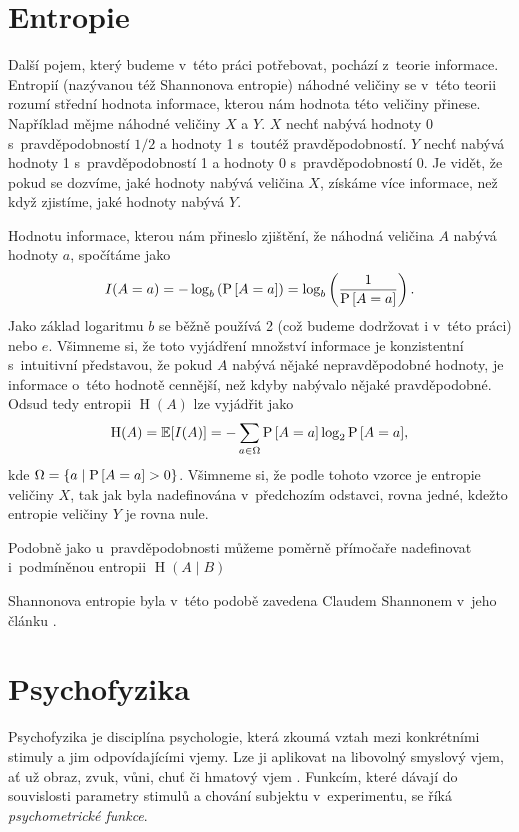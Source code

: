 \section{Entropie}

Další pojem, který budeme v~této práci potřebovat, pochází z~teorie informace.
Entropií (nazývanou též Shannonova entropie) náhodné veličiny se v~této teorii
rozumí střední hodnota informace, kterou nám hodnota této veličiny přinese.
Například mějme náhodné veličiny $X$ a $Y$\!. $X$ nechť nabývá hodnoty 0
s~pravděpodobností $1/2$ a hodnoty 1 s~toutéž pravděpodobností. $Y$ nechť nabývá
hodnoty 1 s~pravděpodobností 1 a hodnoty 0 s~pravděpodobností 0. Je vidět, že
pokud se dozvíme, jaké hodnoty nabývá veličina $X$, získáme více informace, než
když zjistíme, jaké hodnoty nabývá $Y$.  \def\H{\operatorname{H}}

Hodnotu informace, kterou nám přineslo zjištění, že náhodná veličina $A$ nabývá
hodnoty $a$, spočítáme jako $$I(A=a)=-\log_b\left({\P{A=a}}\right)=\log_b\left(\frac1{\P{A=a}}\right).$$ Jako
základ logaritmu $b$ se běžně používá 2 (což budeme dodržovat i v~této práci) nebo $e$. 
Všimneme si, že toto vyjádření množství informace je konzistentní
s~intuitivní představou, že pokud $A$ nabývá nějaké nepravděpodobné
hodnoty, je informace o~této hodnotě cennější, než kdyby nabývalo nějaké pravděpodobné. Odsud tedy
entropii $\H(A)$ lze vyjádřit jako $$\H(A)=\mathbb{E}[I(A)]=-\displaystyle\sum_{a
\in \Omega}\P{A=a}\log_2{\P{A=a}},$$ kde $\Omega = \{a\mid\P{A=a} > 0\}$.
Všimneme si, že podle tohoto vzorce je entropie veličiny $X$, tak jak byla
nadefinována v~předchozím odstavci, rovna jedné, kdežto  entropie veličiny $Y$
je rovna nule.

Podobně jako u~pravděpodobnosti můžeme poměrně přímočaře nadefinovat 
i~podmíněnou entropii $\H(A\mid B)$

Shannonova entropie byla v~této podobě zavedena Claudem Shannonem v~jeho článku \citeyearpar{Entropie}. 

\section{Psychofyzika}

Psychofyzika je disciplína psychologie, která zkoumá vztah mezi konkrétními
stimuly a jim odpovídajícími vjemy. Lze ji aplikovat na libovolný smyslový
vjem, ať už obraz, zvuk, vůni, chuť či hmatový vjem \citep{psychophysics}.
Funkcím, které dávají do souvislosti parametry stimulů a chování subjektu
v~experimentu, se říká {\it psychometrické funkce}. 


